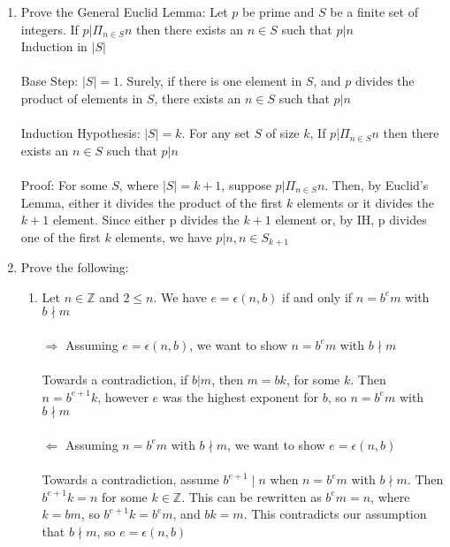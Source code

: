 \documentclass[11pt]{article}
\begin{document}
\begin{enumerate}
\newpage %
\item Prove the General Euclid Lemma: Let $p$ be prime and $S$ be a finite set of integers.  If $p|\Pi_{n \in S}n$ then there exists an $n \in S$ such that $p | n$
\\
Induction in $|S|$
\\\\
Base Step: $|S| = 1$.  Surely, if there is one element in $S$, and $p$ divides the product of elements in $S$, there exists an $n \in S$ such that $p | n$
\\
\\
Induction Hypothesis: $|S| = k$.  For any set $S$ of size $k$, If $p|\Pi_{n \in S}n$ then there exists an $n \in S$ such that $p | n$
\\
\\
Proof: For some $S$, where $|S| = k + 1$, suppose $p | \Pi_{n \in S}n$.  Then, by Euclid's Lemma, either it divides the product of the first $k$ elements or it divides the $k+1$ element.  Since either p divides the $k+1$ element or, by IH, p divides one of the first $k$ elements, we have $p |n, n \in S_{k+1}$

\newpage %
\item Prove the following:
\begin{enumerate}
\item Let $n \in \mathbb{Z}$ and $2 \leq n$.  We have $e = \epsilon(n,b)$ if and only if $n = b^em$ with $b \nmid m$\\
\\
$\Rightarrow$ Assuming $e = \epsilon(n,b)$, we want to show $n = b^em$ with $b \nmid m$\\
\\
Towards a contradiction, if $b|m$, then $m = bk$, for some $k$.  Then $n = b^{e+1}k$, however $e$ was the highest exponent for $b$, so $n = b^em$ with $b \nmid m$
\\
\\
$\Leftarrow$ Assuming $n = b^em$ with $b \nmid m$, we want to show $e = \epsilon(n,b)$\\
\\
Towards a contradiction, assume $b^{e+1} \mid n$ when $n = b^em$ with $b \nmid m$.  Then $b^{e+1}k = n$ for some $k \in \mathbb{Z}$.  This can be rewritten as $b^em = n$, where $k = bm$, so $b^{e+1}k = b^em$, and $bk=m$.  This contradicts our assumption that $b \nmid m$, so $e = \epsilon(n,b)$
\\


\end{enumerate}
\end{enumerate}
\end{document}
